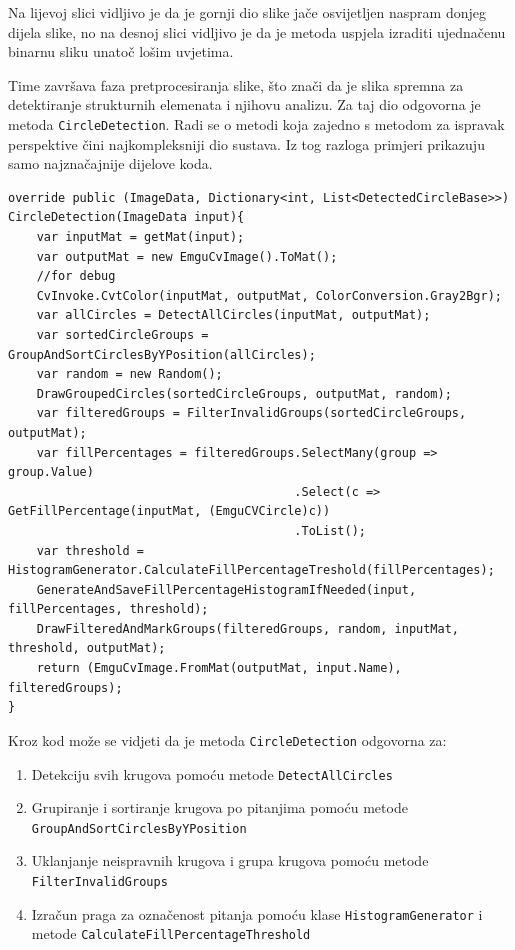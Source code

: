 \documentclass{foi}
\begin{document}
\pagebreak
Na lijevoj slici vidljivo je da je gornji dio slike jače osvijetljen naspram donjeg dijela slike, no na desnoj slici vidljivo je da je metoda uspjela izraditi ujednačenu binarnu sliku unatoč lošim uvjetima.

Time završava faza pretprocesiranja slike, što znači da je slika spremna za detektiranje strukturnih elemenata i njihovu analizu. Za taj dio odgovorna je metoda \texttt{CircleDetection}. Radi se o metodi koja zajedno s metodom za ispravak perspektive čini najkompleksniji dio sustava. Iz tog razloga primjeri prikazuju samo najznačajnije dijelove koda.

\begin{lstlisting}[caption={Metoda za detektiranje odgovora na slici}]
override public (ImageData, Dictionary<int, List<DetectedCircleBase>>) CircleDetection(ImageData input){
    var inputMat = getMat(input);
    var outputMat = new EmguCvImage().ToMat();
    //for debug
    CvInvoke.CvtColor(inputMat, outputMat, ColorConversion.Gray2Bgr);
    var allCircles = DetectAllCircles(inputMat, outputMat);
    var sortedCircleGroups = GroupAndSortCirclesByYPosition(allCircles);
    var random = new Random();
    DrawGroupedCircles(sortedCircleGroups, outputMat, random);
    var filteredGroups = FilterInvalidGroups(sortedCircleGroups, outputMat);
    var fillPercentages = filteredGroups.SelectMany(group => group.Value)
                                        .Select(c => GetFillPercentage(inputMat, (EmguCVCircle)c))
                                        .ToList();
    var threshold = HistogramGenerator.CalculateFillPercentageTreshold(fillPercentages);
    GenerateAndSaveFillPercentageHistogramIfNeeded(input, fillPercentages, threshold);
    DrawFilteredAndMarkGroups(filteredGroups, random, inputMat, threshold, outputMat);
    return (EmguCvImage.FromMat(outputMat, input.Name), filteredGroups);
}
\end{lstlisting}

Kroz kod može se vidjeti da je metoda \texttt{CircleDetection} odgovorna za:
\begin{enumerate}
    \item Detekciju svih krugova pomoću metode \texttt{DetectAllCircles}
    \item Grupiranje i sortiranje krugova po pitanjima pomoću metode \texttt{GroupAndSortCirclesByYPosition}
    \item Uklanjanje neispravnih krugova i grupa krugova pomoću metode \texttt{FilterInvalidGroups}
    \item Izračun praga za označenost pitanja pomoću klase \texttt{HistogramGenerator} i metode \texttt{CalculateFillPercentageThreshold}   
\end{enumerate}
\end{document}
